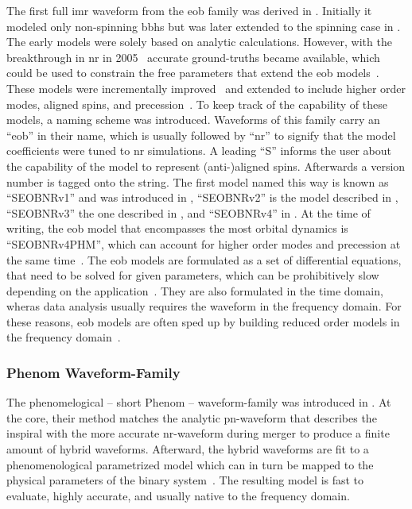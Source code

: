 The first full \acrshort{imr} waveform from the \acrshort{eob} family was derived in \cite{Buonanno:2000ef}. Initially it modeled only non-spinning \acrshort{bbh}s but was later extended to the spinning case in \cite{Buonanno:2005xu, Barausse:2009aa}. The early models were solely based on analytic calculations. However, with the breakthrough in \acrshort{nr} in 2005~\cite{Maggiore:2018aaa, Pretorius:2005gq, Campanelli:2005dd, Baker:2005vv} accurate ground-truths became available, which could be used to constrain the free parameters that extend the \acrshort{eob} models~\cite{Buonanno:2007pf, Damour:2008te}. These models were incrementally improved~\cite{Damour:2009kr, Buonanno:2009qa} and extended to include higher order modes, aligned spins, and precession~\cite{Barausse:2009xi, Pan:2009wj, Pan:2011gk, Pan:2013rra}. To keep track of the capability of these models, a naming scheme was introduced. Waveforms of this family carry an ``\acrshort{eob}'' in their name, which is usually followed by ``\acrshort{nr}'' to signify that the model coefficients were tuned to \acrshort{nr} simulations. A leading ``S'' informs the user about the capability of the model to represent (anti-)aligned spins. Afterwards a version number is tagged onto the string. The first model named this way is known as ``SEOBNRv1'' and was introduced in \cite{Taracchini:2012ig}, ``SEOBNRv2'' is the model described in \cite{Taracchini:2013rva, LIGOScientific:2016vlm}, ``SEOBNRv3'' the one described in \cite{Pan:2013rra, LIGOScientific:2016vlm}, and ``SEOBNRv4'' in \cite{Bohe:2016gbl}. At the time of writing, the \acrshort{eob} model that encompasses the most orbital dynamics is ``SEOBNRv4PHM'', which can account for higher order modes and precession at the same time~\cite{Ossokine:2020kjp}. The \acrshort{eob} models are formulated as a set of differential equations, that need to be solved for given parameters, which can be prohibitively slow depending on the application~\cite{LIGOScientific:2016vlm}. They are also formulated in the time domain, wheras data analysis usually requires the waveform in the frequency domain. For these reasons, \acrshort{eob} models are often sped up by building reduced order models in the frequency domain~\cite{Purrer:2014fza, Purrer:2015tud}.


\subsubsection{Phenom Waveform-Family}
The phenomelogical -- short Phenom -- waveform-family was introduced in \cite{Ajith:2007qp}. At the core, their method matches the analytic \acrshort{pn}-waveform that describes the inspiral with the more accurate \acrshort{nr}-waveform during merger to produce a finite amount of hybrid waveforms. Afterward, the hybrid waveforms are fit to a phenomenological parametrized model which can in turn be mapped to the physical parameters of the binary system~\cite{Santamaria:2010yb}. The resulting model is fast to evaluate, highly accurate, and usually native to the frequency domain.

